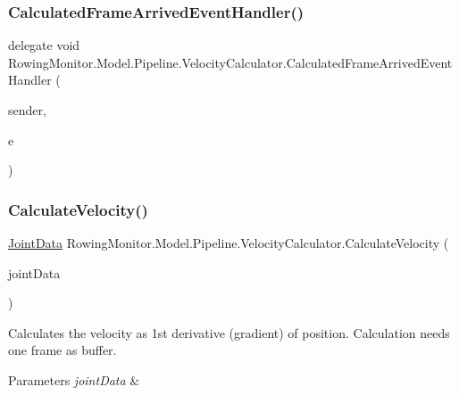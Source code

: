 \subsubsection{\texorpdfstring{Calculated\+Frame\+Arrived\+Event\+Handler()}{CalculatedFrameArrivedEventHandler()}}
{\footnotesize\ttfamily delegate void Rowing\+Monitor.\+Model.\+Pipeline.\+Velocity\+Calculator.\+Calculated\+Frame\+Arrived\+Event\+Handler (\begin{DoxyParamCaption}\item[{Object}]{sender,  }\item[{\hyperlink{class_rowing_monitor_1_1_model_1_1_calculated_frame_arrived_event_args}{Calculated\+Frame\+Arrived\+Event\+Args}}]{e }\end{DoxyParamCaption})}

\mbox{\label{class_rowing_monitor_1_1_model_1_1_pipeline_1_1_velocity_calculator_a679bdfdc1c2c8886cbf5dd329c7f5ee6}} 
\subsubsection{\texorpdfstring{Calculate\+Velocity()}{CalculateVelocity()}}
{\footnotesize\ttfamily \hyperlink{struct_rowing_monitor_1_1_model_1_1_util_1_1_joint_data}{Joint\+Data} Rowing\+Monitor.\+Model.\+Pipeline.\+Velocity\+Calculator.\+Calculate\+Velocity (\begin{DoxyParamCaption}\item[{\hyperlink{struct_rowing_monitor_1_1_model_1_1_util_1_1_joint_data}{Joint\+Data}}]{joint\+Data }\end{DoxyParamCaption})}



Calculates the velocity as 1st derivative (gradient) of position. Calculation needs one frame as buffer. 


\begin{DoxyParams}{Parameters}
{\em joint\+Data} & \\
\hline
\end{DoxyParams}
\mbox{\label{class_rowing_monitor_1_1_model_1_1_pipeline_1_1_velocity_calculator_a6e39f143e7cbb1c99eb6f74734dc3be3}} 
